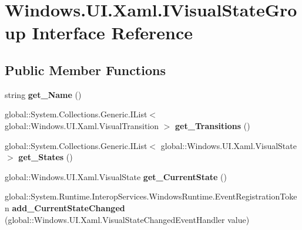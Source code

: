 \hypertarget{interface_windows_1_1_u_i_1_1_xaml_1_1_i_visual_state_group}{}\section{Windows.\+U\+I.\+Xaml.\+I\+Visual\+State\+Group Interface Reference}
\label{interface_windows_1_1_u_i_1_1_xaml_1_1_i_visual_state_group}
\subsection*{Public Member Functions}
\begin{DoxyCompactItemize}
\item 
\mbox{\label{interface_windows_1_1_u_i_1_1_xaml_1_1_i_visual_state_group_aefa260736063a0253bd7b1d360e5dcf0}} 
string {\bfseries get\+\_\+\+Name} ()
\item 
\mbox{\label{interface_windows_1_1_u_i_1_1_xaml_1_1_i_visual_state_group_ac26b8d69e72571edcee2b7ad46c3b2b1}} 
global\+::\+System.\+Collections.\+Generic.\+I\+List$<$ global\+::\+Windows.\+U\+I.\+Xaml.\+Visual\+Transition $>$ {\bfseries get\+\_\+\+Transitions} ()
\item 
\mbox{\label{interface_windows_1_1_u_i_1_1_xaml_1_1_i_visual_state_group_a40eeb37ab129bd4e82ee51c795415b77}} 
global\+::\+System.\+Collections.\+Generic.\+I\+List$<$ global\+::\+Windows.\+U\+I.\+Xaml.\+Visual\+State $>$ {\bfseries get\+\_\+\+States} ()
\item 
\mbox{\label{interface_windows_1_1_u_i_1_1_xaml_1_1_i_visual_state_group_a2994cf852dde78fbd8e46dfff9698768}} 
global\+::\+Windows.\+U\+I.\+Xaml.\+Visual\+State {\bfseries get\+\_\+\+Current\+State} ()
\item 
\mbox{\label{interface_windows_1_1_u_i_1_1_xaml_1_1_i_visual_state_group_ad6ee000116bc2b2c74786dee0efd418c}} 
global\+::\+System.\+Runtime.\+Interop\+Services.\+Windows\+Runtime.\+Event\+Registration\+Token {\bfseries add\+\_\+\+Current\+State\+Changed} (global\+::\+Windows.\+U\+I.\+Xaml.\+Visual\+State\+Changed\+Event\+Handler value)

\end{DoxyCompactItemize}
